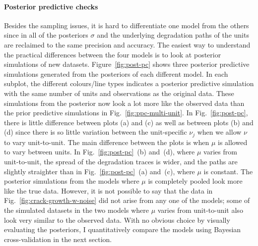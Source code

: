 \paragraph{Posterior predictive checks} Besides the sampling issues, it is hard to differentiate one model from the others since in all of the posteriors $\sigma$ and the underlying degradation paths of the units are reclaimed to the same precision and accuracy. The easiest way to understand the practical differences between the four models is to look at posterior simulations of new datasets. Figure~\ref{fig:post-pc} shows three posterior predictive simulations generated from the posteriors of each different model. In each subplot, the different colours/line types indicates a posterior predictive simulation with the same number of units and observations as the original data. These simulations from the posterior now look a lot more like the observed data than the prior predictive simulations in Fig.~\ref{fig:ppc-multi-unit}. In Fig.~\ref{fig:post-pc}, there is little difference between plots (a) and (c) as well as between plots (b) and (d) since there is so little variation between the unit-specific $\nu_j$ when we allow $\nu$ to vary unit-to-unit. The main difference between the plots is when $\mu$ is allowed to vary between units. In Fig.~\ref{fig:post-pc}~(b) and~(d), where $\mu$ varies from unit-to-unit, the spread of the degradation traces is wider, and the paths are slightly straighter than in Fig.~\ref{fig:post-pc}~(a) and~(c), where $\mu$ is constant. The posterior simulations from the models where $\mu$ is completely pooled look more like the true data. However, it is not possible to say that the data in Fig.~\ref{fig:crack-growth-w-noise} did not arise from any one of the models; some of the simulated datasets in the two models where $\mu$ varies from unit-to-unit also look very similar to the observed data. With no obvious choice by visually evaluating the posteriors, I quantitatively compare the models using Bayesian cross-validation in the next section.

